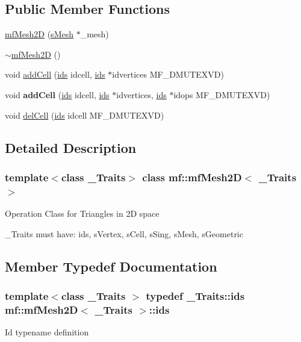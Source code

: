 \subsection*{Public Member Functions}
\begin{DoxyCompactItemize}
\item 
\hyperlink{classmf_1_1mfMesh2D_a5cea95cc70113a2d0c3fcd2361386cc7}{mfMesh2D} (\hyperlink{classmf_1_1mfMesh2D_aa197f7f92e5aa8e68703a5eeb3d9ae04}{sMesh} $\ast$\_\-mesh)
\item 
\hyperlink{classmf_1_1mfMesh2D_a7758ae67057192a0f348a09b1f020a63}{$\sim$mfMesh2D} ()
\item 
void \hyperlink{classmf_1_1mfMesh2D_a03936ceb5649223ff6dc548cf22b4cf7}{addCell} (\hyperlink{classmf_1_1mfMesh2D_a517d508b5d1959b3c697f7c393ccd068}{ids} idcell, \hyperlink{classmf_1_1mfMesh2D_a517d508b5d1959b3c697f7c393ccd068}{ids} $\ast$idvertices MF\_\-DMUTEXVD)
\item 
\hypertarget{classmf_1_1mfMesh2D_aff5a924abb5bcce8be4595aa4a3b6137}{
void {\bfseries addCell} (\hyperlink{classmf_1_1mfMesh2D_a517d508b5d1959b3c697f7c393ccd068}{ids} idcell, \hyperlink{classmf_1_1mfMesh2D_a517d508b5d1959b3c697f7c393ccd068}{ids} $\ast$idvertices, \hyperlink{classmf_1_1mfMesh2D_a517d508b5d1959b3c697f7c393ccd068}{ids} $\ast$idops MF\_\-DMUTEXVD)}
\label{classmf_1_1mfMesh2D_aff5a924abb5bcce8be4595aa4a3b6137}

\item 
void \hyperlink{classmf_1_1mfMesh2D_ada59f56b773f4951e2db41826ab8b644}{delCell} (\hyperlink{classmf_1_1mfMesh2D_a517d508b5d1959b3c697f7c393ccd068}{ids} idcell MF\_\-DMUTEXVD)
\end{DoxyCompactItemize}


\subsection{Detailed Description}
\subsubsection*{template$<$class \_\-Traits$>$ class mf::mfMesh2D$<$ \_\-Traits $>$}

Operation Class for Triangles in 2D space

\_\-Traits must have: ids, sVertex, sCell, sSing, sMesh, sGeometric 

\subsection{Member Typedef Documentation}
\hypertarget{classmf_1_1mfMesh2D_a517d508b5d1959b3c697f7c393ccd068}{
\subsubsection[{ids}]{\setlength{\rightskip}{0pt plus 5cm}template$<$class \_\-Traits $>$ typedef \_\-Traits::ids {\bf mf::mfMesh2D}$<$ \_\-Traits $>$::{\bf ids}}}
\label{classmf_1_1mfMesh2D_a517d508b5d1959b3c697f7c393ccd068}
Id typename definition 

